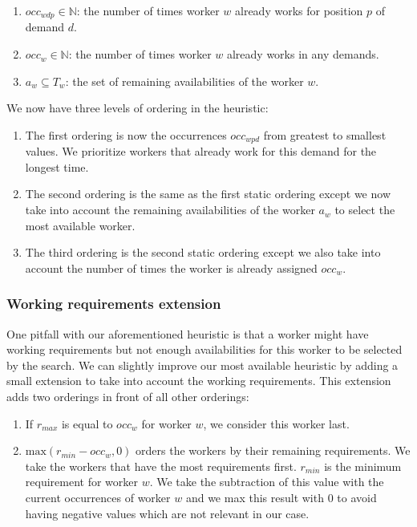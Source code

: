 \documentclass[../../thesis.tex]{subfiles}
\begin{document}
\begin{enumerate}
  \item $occ_{wdp} \in \mathbb{N}$: the number of times worker $w$ already works for position $p$ of demand $d$.
  \item $occ_{w} \in \mathbb{N}$: the number of times worker $w$ already works in any demands.
  \item $a_{w} \subseteq T_w$: the set of remaining availabilities of the worker $w$.
\end{enumerate}

We now have three levels of ordering in the heuristic:

\begin{enumerate}
  \item The first ordering is now the occurrences $occ_{wpd}$ from greatest to smallest values. We prioritize workers that already work for this demand for the longest time.
  \item The second ordering is the same as the first static ordering except we now take into account the 
        remaining availabilities of the worker $a_w$ to select the most available worker.
  \item The third ordering is the second static ordering except we also take into account the number of times the worker 
        is already assigned $occ_w$.
\end{enumerate}


\subsubsection{Working requirements extension}

One pitfall with our aforementioned heuristic is that a worker might have working requirements 
but not enough availabilities for this worker to be selected by the search. We can slightly improve our most available heuristic by adding a small extension to take into account
the working requirements. This extension adds two orderings in front of all other orderings:


\begin{enumerate}
  \item If $r_{max}$ is equal to $occ_{w}$ for worker $w$, we consider this worker last.
  \item $\text{max}(r_{min} - occ_{w}, 0)$ orders the workers by their remaining requirements. We 
  take the workers that have the most requirements first.
  $r_{min}$ is the minimum requirement for worker $w$. We take the subtraction of this value with the current 
  occurrences of worker $w$ and we max this result with 0 to avoid having negative values which are not relevant in our case.
\end{enumerate}
\end{document}
